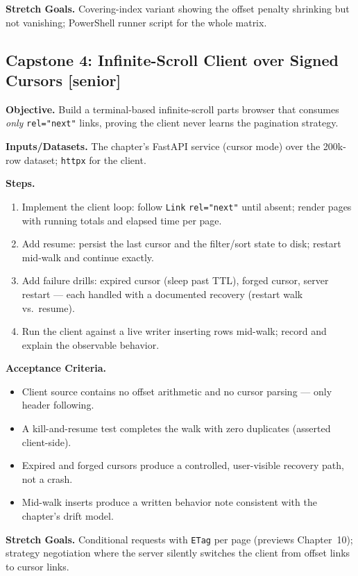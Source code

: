 \textbf{Stretch Goals.} Covering-index variant showing the offset penalty
shrinking but not vanishing; PowerShell runner script for the whole matrix.

\subsection{Capstone 4: Infinite-Scroll Client over Signed Cursors [senior]}

\textbf{Objective.} Build a terminal-based infinite-scroll parts browser
that consumes \emph{only} \texttt{rel="next"} links, proving the client
never learns the pagination strategy.

\textbf{Inputs/Datasets.} The chapter's FastAPI service (cursor mode) over
the 200k-row dataset; \texttt{httpx} for the client.

\textbf{Steps.}
\begin{enumerate}
  \item Implement the client loop: follow \texttt{Link}
        \texttt{rel="next"} until absent; render pages with running totals
        and elapsed time per page.
  \item Add resume: persist the last cursor and the filter/sort state to
        disk; restart mid-walk and continue exactly.
  \item Add failure drills: expired cursor (sleep past TTL), forged cursor,
        server restart --- each handled with a documented recovery
        (restart walk vs.\ resume).
  \item Run the client against a live writer inserting rows mid-walk;
        record and explain the observable behavior.
\end{enumerate}

\textbf{Acceptance Criteria.}
\begin{itemize}
  \item[$\square$] Client source contains no offset arithmetic and no
        cursor parsing --- only header following.
  \item[$\square$] A kill-and-resume test completes the walk with zero
        duplicates (asserted client-side).
  \item[$\square$] Expired and forged cursors produce a controlled,
        user-visible recovery path, not a crash.
  \item[$\square$] Mid-walk inserts produce a written behavior note
        consistent with the chapter's drift model.
\end{itemize}

\textbf{Stretch Goals.} Conditional requests with \texttt{ETag} per page
(previews Chapter~10); strategy negotiation where the server silently
switches the client from offset links to cursor links.

